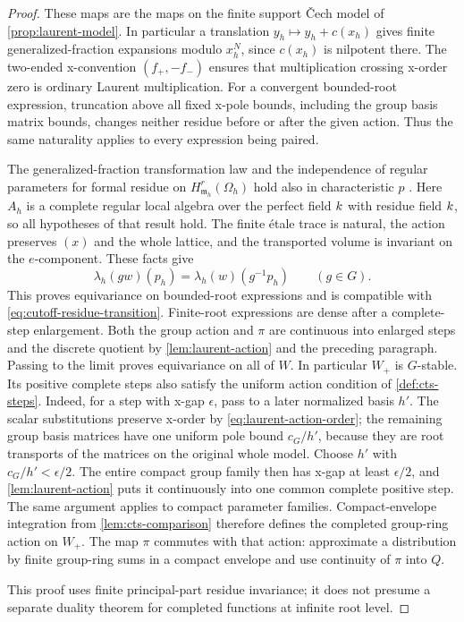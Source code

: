 \begin{proof}
These maps are the maps on the finite support \v Cech model of
\cref{prop:laurent-model}.  In particular a translation
$y_h\mapsto y_h+c(x_h)$ gives finite generalized-fraction
expansions modulo $x_h^N$, since $c(x_h)$ is nilpotent there.
The two-ended x-convention $(f_+,-f_-)$ ensures that multiplication
crossing x-order zero is ordinary Laurent multiplication.
For a convergent bounded-root expression, truncation above all fixed
x-pole bounds, including the group basis matrix bounds, changes
neither residue before or after the given action.  Thus the same
naturality applies to every expression being paired.

The generalized-fraction transformation law and the independence of
regular parameters for formal residue on
$H^r_{\mathfrak m_h}(\Omega_h)$ hold also in characteristic $p$
\citep[Lemmas~(7.2)(b) and~(7.3), pp.~60--67]{lipmanResidues1984}.
Here $A_h$ is a complete regular local algebra over the perfect
field $k$ with residue field $k$, so all hypotheses of that
result hold.  The finite étale trace is natural, the action preserves
$(x)$ and the whole lattice, and the transported volume is invariant
on the $e$-component.  These facts give
\[
 \lambda_h(gw)(p_h)=\lambda_h(w)(g^{-1}p_h)
 \qquad(g\in G).
\]
This proves equivariance on bounded-root expressions and is compatible
with \cref{eq:cutoff-residue-transition}.  Finite-root expressions
are dense after a complete-step enlargement.  Both the group action
and $\pi$ are continuous into enlarged steps and the discrete
quotient by \cref{lem:laurent-action} and the preceding paragraph.
Passing to the limit proves equivariance on all of $W$.  In particular
$W_+$ is $G$-stable.  Its positive complete steps also satisfy the
uniform action condition of \cref{def:cts-steps}.  Indeed, for a step
with x-gap $\epsilon$, pass to a later normalized basis $h'$.
The scalar substitutions preserve x-order by
\cref{eq:laurent-action-order}; the remaining group basis matrices
have one uniform pole bound $c_G/h'$, because they are root transports
of the matrices on the original whole model.  Choose $h'$ with
$c_G/h'<\epsilon/2$.  The entire compact group family then has x-gap
at least $\epsilon/2$, and \cref{lem:laurent-action} puts it
continuously into one common complete positive step.  The same
argument applies to compact parameter families.  Compact-envelope
integration from \cref{lem:cts-comparison} therefore defines the
completed group-ring action on $W_+$.  The map $\pi$ commutes with
that action: approximate a distribution by finite group-ring sums
in a compact envelope and use continuity of $\pi$ into $Q$.

This proof uses finite principal-part residue
invariance; it does not presume a separate duality theorem for
completed functions at infinite root level.
\end{proof}

